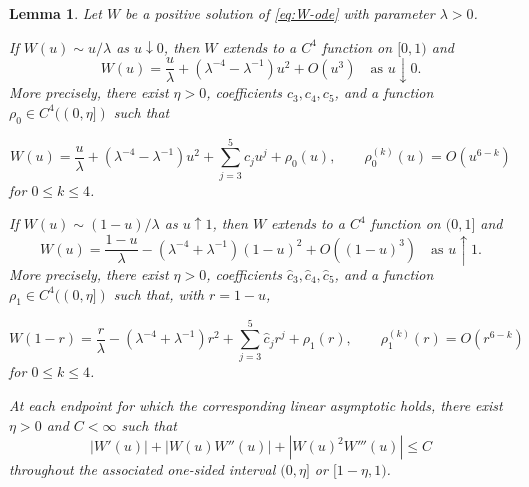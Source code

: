 \documentclass[12pt]{amsart}
\numberwithin{equation}{section}
\theoremstyle{plain}
\newtheorem{lemma}[theorem]{Lemma}
\theoremstyle{definition}
\begin{document}
\begin{lemma}
\label{lem:linear-branch-regularity}
Let $W$ be a positive solution of \eqref{eq:W-ode} with parameter
$\lambda>0$.

If $W(u)\sim u/\lambda$ as $u\downarrow0$, then $W$ extends to a
$C^4$ function on $[0,1)$ and
\begin{equation*}
 W(u)=\frac u\lambda+
 \left(\lambda^{-4}-\lambda^{-1}\right)u^2+O(u^3)
 \quad\text{as }u\downarrow0.
\end{equation*}
More precisely, there exist $\eta>0$, coefficients $c_3,c_4,c_5$, and a
function $\rho_0\in C^4((0,\eta])$ such that
\begin{samepage}
\begin{equation}
 W(u)=\frac u\lambda+
 \left(\lambda^{-4}-\lambda^{-1}\right)u^2
 +\sum_{j=3}^5c_ju^j+\rho_0(u),
 \qquad
 \rho_0^{(k)}(u)=O(u^{6-k})
 \label{eq:W-expansion-zero-differentiable}
\end{equation}
for $0\le k\le4$.
\end{samepage}


If $W(u)\sim(1-u)/\lambda$ as $u\uparrow1$, then $W$ extends to a
$C^4$ function on $(0,1]$ and
\begin{equation*}
 W(u)=\frac{1-u}{\lambda}
 -\left(\lambda^{-4}+\lambda^{-1}\right)(1-u)^2
 +O((1-u)^3)
 \quad\text{as }u\uparrow1.
\end{equation*}
More precisely, there exist $\eta>0$, coefficients
$\widehat c_3,\widehat c_4,\widehat c_5$, and a function
$\rho_1\in C^4((0,\eta])$ such that, with $r=1-u$,
\begin{samepage}
 \begin{equation}
 W(1-r)=\frac r\lambda
 -\left(\lambda^{-4}+\lambda^{-1}\right)r^2
 +\sum_{j=3}^5\widehat c_jr^j+\rho_1(r),
 \qquad
 \rho_1^{(k)}(r)=O(r^{6-k})
 \label{eq:W-expansion-one-differentiable}
\end{equation}
for $0\le k\le4$.
\end{samepage}


At each endpoint for which the corresponding linear asymptotic holds, there
exist $\eta>0$ and $C<\infty$ such that
\begin{equation}
 |W'(u)|+|W(u)W''(u)|+|W(u)^2W'''(u)|\le C
 \label{eq:W-relative-derivative-bounds}
\end{equation}
throughout the associated one-sided interval $(0,\eta]$ or
$[1-\eta,1)$.
\end{lemma}
\end{document}
